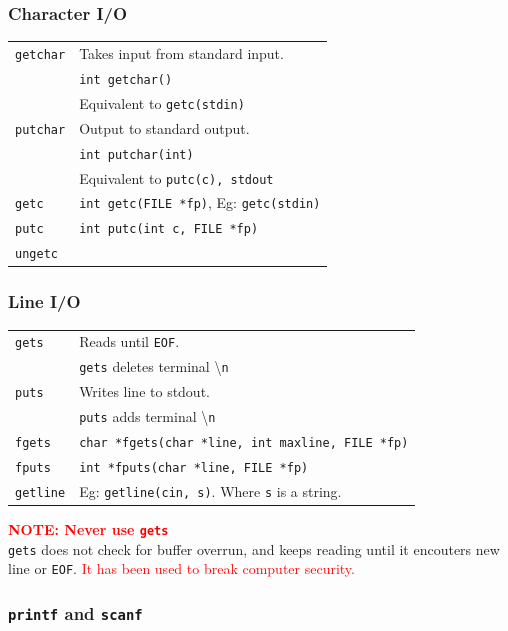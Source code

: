 \subsubsection{Character I/O}
\begin{tabularx}{\linewidth}{lX}
\texttt{getchar} & Takes input from standard input.\\
& \texttt{int getchar()}\\
& Equivalent to \texttt{getc(stdin)}\\
\texttt{putchar} & Output to standard output.\\
& \texttt{int putchar(int)}\\
& Equivalent to \texttt{putc(c), stdout}\\
\texttt{getc} & \texttt{int getc(FILE *fp)}, Eg: \texttt{getc(stdin)}\\
\texttt{putc} & \texttt{int putc(int c, FILE *fp)}\\
\texttt{ungetc} & \\
\end{tabularx}

\subsubsection{Line I/O}
\begin{tabularx}{\linewidth}{lX}
\texttt{gets} & Reads until \texttt{EOF}.\\
& \texttt{gets} deletes terminal \textbackslash \texttt{n}\\
\texttt{puts} & Writes line to stdout.\\
& \texttt{puts} adds terminal \textbackslash \texttt{n}\\
\texttt{fgets} & \texttt{char *fgets(char *line, int maxline, FILE *fp)}\\
\texttt{fputs} & \texttt{int *fputs(char *line, FILE *fp)}\\
\texttt{getline} & Eg: \texttt{getline(cin, s)}. Where \texttt{s} is a string.
\end{tabularx}

\begin{mdframed}
\textbf{\textcolor{red}{NOTE: Never use \texttt{gets}}}\\
\texttt{gets} does not check for buffer overrun, and keeps reading until it encouters new line or \texttt{EOF}.
\textcolor{red}{It has been used to break computer security.}
\end{mdframed}

\vfill \null

\subsubsection{\texttt{printf} and \texttt{scanf}}
